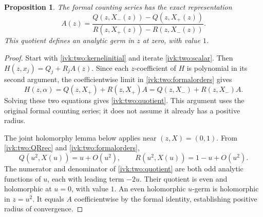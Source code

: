 \documentclass[11pt,letterpaper]{article}
\newtheorem{proposition}[theorem]{Proposition}
\theoremstyle{remark}\newtheorem{remark}[theorem]{Remark}
\begin{document}
\begin{proposition}\label{ivk:two:germ}
The formal counting series has the exact representation
\begin{equation}\label{ivk:two:quotient}
 A(z)=\frac{Q(z,X_-(z))-Q(z,X_+(z))}
             {R(z,X_+(z))-R(z,X_-(z))}.
\end{equation}
This quotient defines an analytic germ in $z$ at zero, with value $1$.
\end{proposition}
\begin{proof}
Start with \eqref{ivk:two:kernelinitial} and iterate \eqref{ivk:two:scalar}. Then
$H(z,x_j)=Q_j+R_jA(z)$. Since each $z$-coefficient of $H$ is polynomial
in its second argument, the coefficientwise limit in
\eqref{ivk:two:formalorders} gives
\[
 H(z,\alpha)=Q(z,X_+)+R(z,X_+)A
           =Q(z,X_-)+R(z,X_-)A.
\]
Solving these two equations gives \eqref{ivk:two:quotient}. This argument uses
the original formal counting series; it does not assume it already has
a positive radius.

The joint holomorphy lemma below applies near $(z,X)=(0,1)$.
From \eqref{ivk:two:QRrec} and \eqref{ivk:two:formalorders},
\[
 Q(u^2,X(u))=u+O(u^2),\qquad
 R(u^2,X(u))=1-u+O(u^2).
\]
The numerator and denominator of \eqref{ivk:two:quotient} are both odd analytic
functions of $u$, each with leading term $-2u$. Their quotient is even
and holomorphic at $u=0$, with value $1$. An even holomorphic $u$-germ
is holomorphic in $z=u^2$. It equals $A$ coefficientwise by the formal
identity, establishing positive radius of convergence.
\end{proof}
\end{document}
